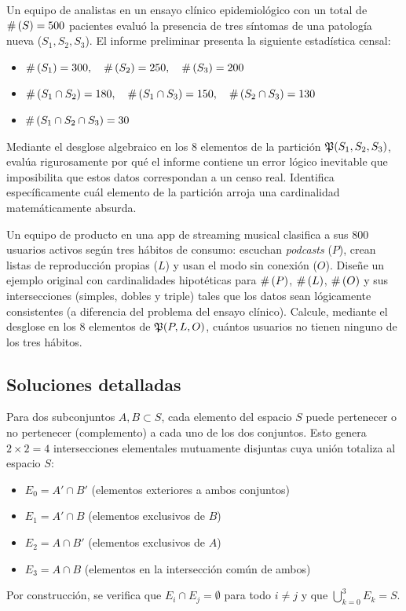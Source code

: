 \begin{problema}
	\label{prob:15ead08}
	Un equipo de analistas en un ensayo clínico epidemiológico con un total de $\#\left( S \right) = 500$ pacientes evaluó la presencia de tres síntomas de una patología nueva ($S_1, S_2, S_3$). El informe preliminar presenta la siguiente estadística censal:
	\begin{itemize}
		\item $\#\left( S_1 \right) = 300, \quad \#\left( S_2 \right) = 250, \quad \#\left( S_3 \right) = 200$
		\item $\#\left( S_1 \cap S_2 \right) = 180, \quad \#\left( S_1 \cap S_3 \right) = 150, \quad \#\left( S_2 \cap S_3 \right) = 130$
		\item $\#\left( S_1 \cap S_2 \cap S_3 \right) = 30$
	\end{itemize}
	Mediante el desglose algebraico en los 8 elementos de la partición $\mathfrak{P}(S_1,S_2,S_3)$, evalúa rigurosamente por qué el informe contiene un error lógico inevitable que imposibilita que estos datos correspondan a un censo real. Identifica específicamente cuál elemento de la partición arroja una cardinalidad matemáticamente absurda.
\end{problema}

\begin{problema}
	\label{prob:95d5458}
	Un equipo de producto en una app de streaming musical clasifica a sus 800 usuarios activos según tres hábitos de consumo: escuchan \emph{podcasts} ($P$), crean listas de reproducción propias ($L$) y usan el modo sin conexión ($O$). Diseñe un ejemplo original con cardinalidades hipotéticas para $\#\left( P \right)$, $\#\left( L \right)$, $\#\left( O \right)$ y sus intersecciones (simples, dobles y triple) tales que los datos sean lógicamente consistentes (a diferencia del problema del ensayo clínico). Calcule, mediante el desglose en los 8 elementos de $\mathfrak{P}(P,L,O)$, cuántos usuarios no tienen ninguno de los tres hábitos.
\end{problema}

\subsection*{Soluciones detalladas}

\begin{solproblema}[prob:b94325d]
	Para dos subconjuntos $A, B \subset S$, cada elemento del espacio $S$ puede pertenecer o no pertenecer (complemento) a cada uno de los dos conjuntos. Esto genera $2 \times 2 = 4$ intersecciones elementales mutuamente disjuntas cuya unión totaliza al espacio $S$:
	\begin{itemize}
		\item $E_0 = A' \cap B'$ (elementos exteriores a ambos conjuntos)
		\item $E_1 = A' \cap B$ (elementos exclusivos de $B$)
		\item $E_2 = A \cap B'$ (elementos exclusivos de $A$)
		\item $E_3 = A \cap B$ (elementos en la intersección común de ambos)
	\end{itemize}
	Por construcción, se verifica que $E_i \cap E_j = \emptyset$ para todo $i \neq j$ y que $\bigcup_{k=0}^3 E_k = S$.
\end{solproblema}

